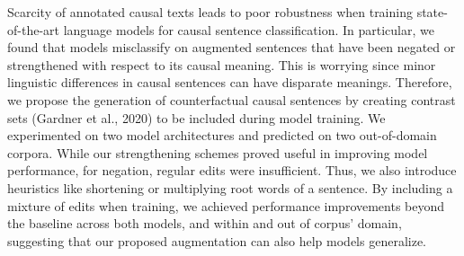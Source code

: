 Scarcity of annotated causal texts leads to poor robustness when training state-of-the-art language models for causal sentence classification. In particular, we found that models misclassify on augmented sentences that have been negated or strengthened with respect to its causal meaning. This is worrying since minor linguistic differences in causal sentences can have disparate meanings. Therefore, we propose the generation of counterfactual causal sentences by creating contrast sets (Gardner et al., 2020) to be included during model training. We experimented on two model architectures and predicted on two out-of-domain corpora. While our strengthening schemes proved useful in improving model performance, for negation, regular edits were insufficient. Thus, we also introduce heuristics like shortening or multiplying root words of a sentence. By including a mixture of edits when training, we achieved performance improvements beyond the baseline across both models, and within and out of corpus' domain, suggesting that our proposed augmentation can also help models generalize.
